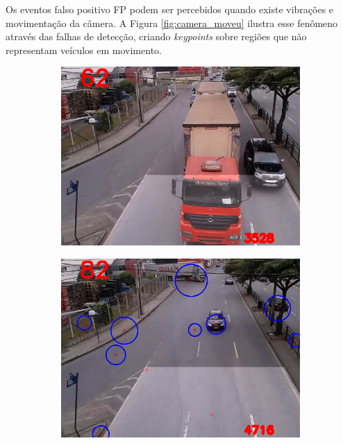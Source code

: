 Os eventos falso positivo FP podem ser percebidos quando existe vibrações e movimentação da câmera. A Figura \ref{fig:camera_moveu} ilustra esse fenômeno através das falhas de detecção, criando \textit{keypoints} sobre regiões que não representam veículos em movimento.

\begin{figure}[ht]
  \begin{center}
    \begin{subfigure}[b]{.49\textwidth}
      \begin{center}
        \includegraphics[width=1\linewidth]{imgs/veiculo_grande.png}
      \end{center}
      \caption{}
      \label{fig:veiculo_grande}
    \end{subfigure}
    \begin{subfigure}[b]{.49\textwidth}
      \begin{center}
        \includegraphics[width=1\linewidth]{imgs/camera_moveu.png}

\end{center}
\end{subfigure}
\end{center}
\end{figure}
